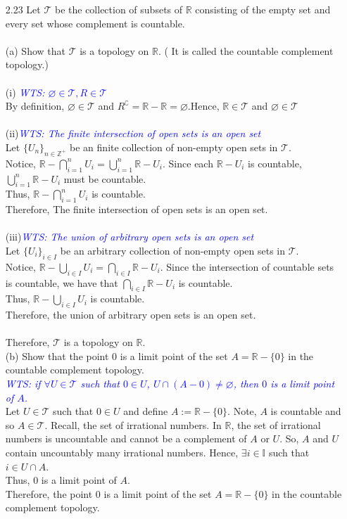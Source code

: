 \documentclass[12pt]{article}
\newcommand{\R}{\mathbb{R}}
\newcommand{\Z}{\mathbb{Z}}
\newcommand{\TT}{\mathcal{T}}
\newcommand{\wts}[1]{\textit{\textcolor{blue}{WTS: #1}}\\}
\begin{document}
	\begin{enumerate}
		
		\item[2.23] Let $\mathcal{T}$ be the collection of subsets of $\mathbb{R}$ consisting of the empty set and every set whose complement is countable.\\
		\\
		(a) Show that $\mathcal{T}$ is a topology on $\R$. ( It is called the countable complement topology.)\\
		\\
		(i) \wts{$ \varnothing\in \TT, R\in\TT $}
		By definition, $ \varnothing\in\TT $ and $ R^\complement=\R-\R=\varnothing $.Hence, $ \R\in\TT $ and $ \varnothing\in\TT $\\\\
		(ii)\wts{The finite intersection of open sets is an open set}
		Let $ \{U_n\}_{n\in \Z^+} $ be an finite collection of non-empty open sets in $ \TT $. \\
		Notice, $ \R -\bigcap^n_{i=1} U_i = \bigcup^n_{i=1} \R - U_i  $. Since each $\R-U_i$ is countable, $ \bigcup^n_{i=1} \R - U_i   $ must be countable.\\
		Thus,  $\R -\bigcap^n_{i=1} U_i$ is countable.\\
		Therefore, The finite intersection of open sets is an open set.\\
		\\(iii)\wts{The union of arbitrary open sets is an open set}
		Let $ \{U_i\}_{i\in I} $ be an arbitrary collection of non-empty open sets in $ \TT $. \\
		Notice, $ \R -\bigcup_{i\in I} U_i = \bigcap_{i\in I} \R - U_i  $. Since the intersection of countable sets is countable, we have that $ \bigcap_{i\in I} \R- U_i $ is countable. \\
		Thus, $ \R-\bigcup_{i\in I} U_i  $ is countable.\\
		Therefore, the union of arbitrary open sets is an open set.\\
		\\
		Therefore, $ \TT $ is a topology on $ \R $.
		\\(b) Show that the point 0 is a limit point of the set $A=\mathbb{R}-\{0\}$ in the countable complement topology.\\
		\wts{if $\forall U\in\TT$ such that $0\in U$, $U\cap (A-0) \not= \varnothing$, then $0$ is a limit point of $A$.}
		Let $ U\in\TT $ such that $ 0\in U $ and define $ A:= \R-\{0\} $. Note, $ A $ is countable and so $ A\in \TT $. Recall, the set of irrational numbers. In $ \R $, the set of irrational numbers is uncountable and cannot be a complement of $ A $ or $ U $. So, $ A $ and $ U $ contain uncountably many irrational numbers. Hence, $ \exists i\in\mathbb{I} $ such that $ i\in U\cap A $.\\
		Thus, $ 0 $ is a limit point of $ A $.\\
		Therefore, the point 0 is a limit point of the set $A=\mathbb{R}-\{0\}$ in the countable complement topology.\\
		

\end{enumerate}
\end{document}
